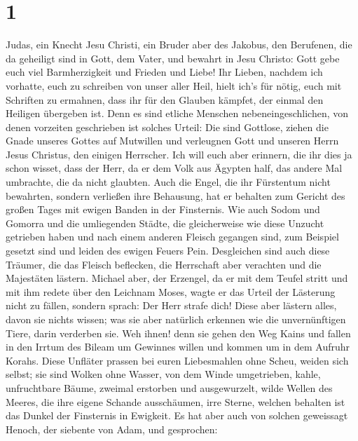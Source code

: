 \hypertarget{section}{%
\section{1}\label{section}}

 Judas, ein Knecht Jesu Christi, ein Bruder aber des
Jakobus, den Berufenen, die da geheiligt sind in Gott, dem Vater, und
bewahrt in Jesu Christo:  Gott gebe euch viel Barmherzigkeit
und Frieden und Liebe!  Ihr Lieben, nachdem ich vorhatte,
euch zu schreiben von unser aller Heil, hielt ich's für nötig, euch mit
Schriften zu ermahnen, dass ihr für den Glauben kämpfet, der einmal den
Heiligen übergeben ist.  Denn es sind etliche Menschen
nebeneingeschlichen, von denen vorzeiten geschrieben ist solches Urteil:
Die sind Gottlose, ziehen die Gnade unseres Gottes auf Mutwillen und
verleugnen Gott und unseren Herrn Jesus Christus, den einigen Herrscher.
 Ich will euch aber erinnern, die ihr dies ja schon wisset,
dass der Herr, da er dem Volk aus Ägypten half, das andere Mal
umbrachte, die da nicht glaubten.  Auch die Engel, die ihr
Fürstentum nicht bewahrten, sondern verließen ihre Behausung, hat er
behalten zum Gericht des großen Tages mit ewigen Banden in der
Finsternis.  Wie auch Sodom und Gomorra und die umliegenden
Städte, die gleicherweise wie diese Unzucht getrieben haben und nach
einem anderen Fleisch gegangen sind, zum Beispiel gesetzt sind und
leiden des ewigen Feuers Pein.  Desgleichen sind auch diese
Träumer, die das Fleisch beflecken, die Herrschaft aber verachten und
die Majestäten lästern.  Michael aber, der Erzengel, da er
mit dem Teufel stritt und mit ihm redete über den Leichnam Moses, wagte
er das Urteil der Lästerung nicht zu fällen, sondern sprach: Der Herr
strafe dich!  Diese aber lästern alles, davon sie nichts
wissen; was sie aber natürlich erkennen wie die unvernünftigen Tiere,
darin verderben sie.  Weh ihnen! denn sie gehen den Weg
Kains und fallen in den Irrtum des Bileam um Gewinnes willen und kommen
um in dem Aufruhr Korahs.  Diese Unfläter prassen bei euren
Liebesmahlen ohne Scheu, weiden sich selbst; sie sind Wolken ohne
Wasser, von dem Winde umgetrieben, kahle, unfruchtbare Bäume, zweimal
erstorben und ausgewurzelt,  wilde Wellen des Meeres, die
ihre eigene Schande ausschäumen, irre Sterne, welchen behalten ist das
Dunkel der Finsternis in Ewigkeit.  Es hat aber auch von
solchen geweissagt Henoch, der siebente von Adam, und gesprochen:
